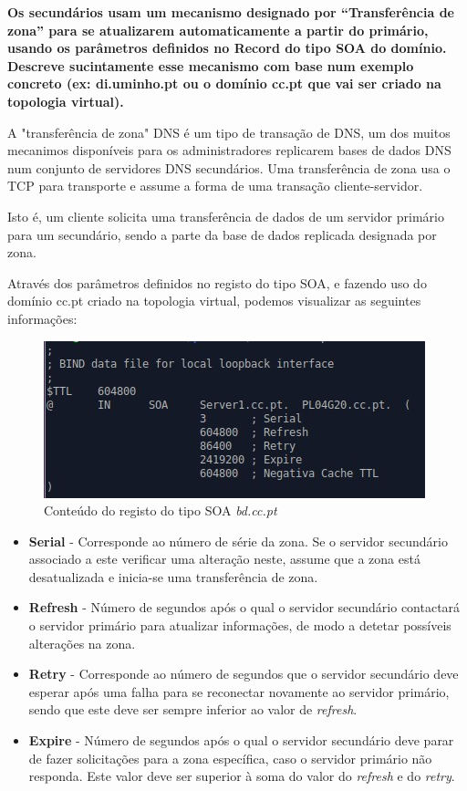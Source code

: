 \documentclass[11pt]{article}
\begin{document}
\textbf{Os secundários usam um mecanismo designado por “Transferência de zona” para se atualizarem automaticamente a partir do primário, usando os parâmetros definidos no Record do tipo SOA do domínio. Descreve sucintamente esse mecanismo com base num exemplo concreto (ex: di.uminho.pt ou o domínio cc.pt que vai ser criado na topologia virtual).}

\par A "transferência de zona" DNS é um tipo de transação de DNS, um dos muitos mecanimos disponíveis para os administradores replicarem bases de dados DNS num conjunto de servidores DNS secundários. Uma transferência de zona usa o TCP para transporte e assume a forma de uma transação cliente-servidor.

\par Isto é, um cliente solicita uma transferência de dados de um servidor primário para um secundário, sendo a parte da base de dados replicada designada por zona.

\par Através dos parâmetros definidos no registo do tipo SOA, e fazendo uso do domínio cc.pt criado na topologia virtual, podemos visualizar as seguintes informações:

\begin{figure}[!htb]
    \centering
    \includegraphics[width=.7\textwidth]{images/Parte1/p1_j.jpg}
    \caption{Conteúdo do registo do tipo SOA \textit{bd.cc.pt}}
    \label{fig:dbccpt}
\end{figure}

\begin{itemize}
    \item \textbf{Serial} - Corresponde ao número de série da zona. Se o servidor secundário associado a este verificar uma alteração neste, assume que a zona está desatualizada e inicia-se uma transferência de zona.
    \item \textbf{Refresh} - Número de segundos após o qual o servidor secundário contactará o servidor primário para atualizar informações, de modo a detetar possíveis alterações na zona.
    \item \textbf{Retry} - Corresponde ao número de segundos que o servidor secundário deve esperar após uma falha para se reconectar novamente ao servidor primário, sendo que este deve ser sempre inferior ao valor de \textit{refresh}.
    \item \textbf{Expire} - Número de segundos após o qual o servidor secundário deve parar de fazer solicitações para a zona específica, caso o servidor primário não responda. Este valor deve ser superior à soma do valor do \textit{refresh} e do \textit{retry}.
\end{itemize}
\end{document}
